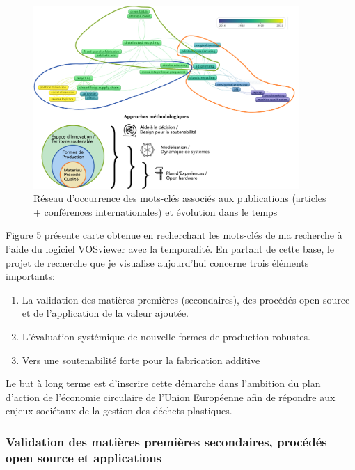 \documentclass[
  11pt,
]{article}
\providecommand{\tightlist}{%
  \setlength{\itemsep}{0pt}\setlength{\parskip}{0pt}}\usepackage{longtable,booktabs,array}
\begin{document}
\begin{figure}[H]

{\centering \includegraphics[width=0.9\textwidth,height=\textheight]{Figures/Vosviewer/Vosviewer-Fabio.pdf}

}

\caption{Réseau d'occurrence des mots-clés associés aux publications
(articles + conférences internationales) et évolution dans le temps}

\end{figure}

Figure 5 présente carte obtenue en recherchant les mots-clés de ma
recherche à l'aide du logiciel VOSviewer avec la temporalité. En partant
de cette base, le projet de recherche que je visualise aujourd'hui
concerne trois éléments importants:

\begin{enumerate}
\def\labelenumi{\arabic{enumi}.}
\tightlist
\item
  La validation des matières premières (secondaires), des procédés open
  source et de l'application de la valeur ajoutée.
\item
  L'évaluation systémique de nouvelle formes de production robustes.
\item
  Vers une soutenabilité forte pour la fabrication additive
\end{enumerate}

Le but à long terme est d'inscrire cette démarche dans l'ambition du
plan d'action de l'économie circulaire de l'Union Européenne afin de
répondre aux enjeux sociétaux de la gestion des déchets plastiques.

\hypertarget{validation-des-matiuxe8res-premiuxe8res-secondaires-procuxe9duxe9s-open-source-et-applications}{%
\subsubsection{Validation des matières premières secondaires, procédés
open source et
applications}\label{validation-des-matiuxe8res-premiuxe8res-secondaires-procuxe9duxe9s-open-source-et-applications}}
\end{document}
